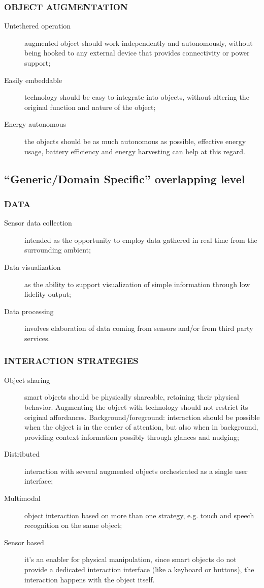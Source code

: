 \subsubsection{OBJECT AUGMENTATION}
\begin{description}
\item [Untethered operation] augmented object should work independently and autonomously, without being hooked to any external device that provides connectivity or power support;
\item [Easily embeddable] technology should be easy to integrate into objects, without altering the original function and nature of the object;
\item [Energy autonomous] the objects should be as much autonomous as possible, effective energy usage, battery efficiency and energy harvesting can help at this regard.
\end{description}


\subsection{``Generic/Domain Specific'' overlapping level}
\medskip

\subsubsection{DATA}
\begin{description}
\item [Sensor data collection] intended as the opportunity to employ data gathered in real time from the surrounding ambient;
\item [Data visualization] as the ability to support visualization of simple information through low fidelity output;
\item [Data processing] involves elaboration of data coming from sensors and/or from third party services.
\end{description}

\subsubsection{INTERACTION STRATEGIES}
\begin{description}
\item [Object sharing] smart objects should be physically shareable, retaining their physical behavior. Augmenting the object with technology should not restrict its original affordances.
Background/foreground: interaction should be possible when the object is in the center of attention, but also when in background, providing context information possibly through glances and nudging;
\item [Distributed] interaction with several augmented objects orchestrated as a single user interface;
\item [Multimodal] object interaction based on more than one strategy, e.g. touch and speech recognition on the same object;
\item [Sensor based] it's an enabler for physical manipulation, since smart objects do not provide a dedicated interaction interface (like a keyboard or buttons), the interaction happens with the object itself.
\end{description}


